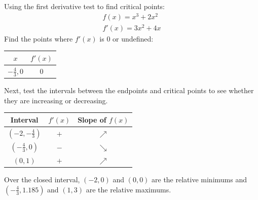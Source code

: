 \documentclass[12pt]{article}
\begin{document}
                \noindent Using the first derivative test to find critical points:
                \begin{gather*}
                    f(x) = x^3 + 2x^2 \\
                    f'(x) = 3x^2 + 4x
                \end{gather*}
                Find the points where $f'(x)$ is $0$ or undefined:
                \begin{center}
                    \begin{tabular}{|c|c|}
                        \hline
                        $x$ & $f'(x)$ \\
                        \hline \hline
                        $-\frac{4}{3}, 0$ & $0$ \\
                        \hline
                    \end{tabular}
                \end{center}
                Next, test the intervals between the endpoints and critical points to see whether they are increasing or decreasing.
                \begin{center}
                    \begin{tabular}{|c|c|c|}
                        \hline
                        Interval & $f'(x)$ & Slope of $f(x)$ \\
                        \hline \hline
                        $(-2, -\frac{4}{3})$ & $+$ & $\nearrow$ \\
                        \hline
                        $(-\frac{4}{3}, 0)$ & $-$ & $\searrow$ \\
                        \hline
                        $(0, 1)$ & $+$ & $\nearrow$ \\
                        \hline
                    \end{tabular}
                \end{center}
                Over the closed interval, $(-2, 0)$ and $(0, 0)$ are the relative minimums and $(-\frac{4}{3}, 1.185)$ and $(1, 3)$ are the relative maximums.
\end{document}
